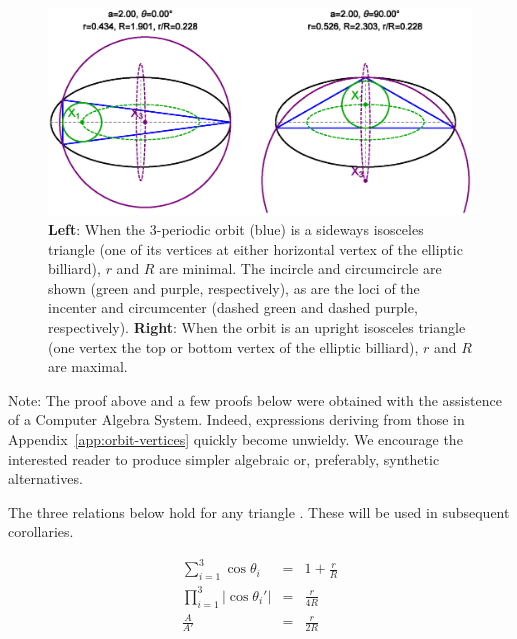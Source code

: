 \documentclass{article}
\theoremstyle{definition}
\begin{document}
\begin{figure}[H]
    \centering
    \includegraphics[trim={0 0.5cm 0 0},clip,width=\textwidth]{1060_radii_min_max_orbits}
    \caption{\textbf{Left}: When the 3-periodic orbit (blue) is a sideways isosceles triangle (one of its vertices   at either horizontal vertex of the elliptic billiard), $r$ and $R$ are minimal. The incircle and circumcircle are shown (green and purple, respectively), as are the loci of the incenter and circumcenter (dashed green and dashed purple, respectively). \textbf{Right}: When the orbit is an upright isosceles triangle (one vertex   the top or bottom vertex of the elliptic billiard), $r$ and $R$ are maximal.}
    \label{fig:rR-min-max}
\end{figure}


Note: The proof above and a few proofs below were obtained with the  assistence of   a Computer Algebra System. Indeed, expressions deriving from those in Appendix~\ref{app:orbit-vertices} quickly become unwieldy. We encourage the interested reader to produce simpler algebraic or, preferably, synthetic alternatives.

The three relations below hold for any triangle \cite{johnson29}. These will be used in subsequent corollaries.

\begin{eqnarray}
\sum_{i=1}^{3}{\cos\theta_i}&=&1+\frac{r}{R} \label{eqn:sum-cos} \\
\prod_{i=1}^{3}{|\cos\theta_i'|}&=&\frac{r}{4R} \label{eqn:exc-prod-cos} \\
\frac{A}{A'}&=&\frac{r}{2R}
\label{eqn:area-ratio}
\end{eqnarray}
\end{document}
